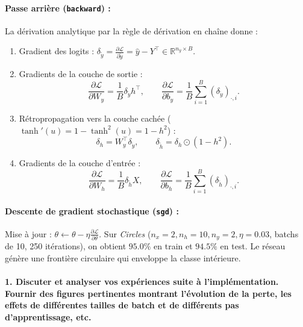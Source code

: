 \documentclass{report}
\begin{document}
\paragraph{Passe arrière (\texttt{backward}) :}
La dérivation analytique par la règle de dérivation en chaîne donne :
\begin{enumerate}
    \item Gradient des logits : $\delta_{\tilde{y}} = \frac{\partial \mathcal{L}}{\partial \tilde{y}} = \hat{y} - Y^\top \in \mathbb{R}^{n_y \times B}$.
    \item Gradients de la couche de sortie :
    \begin{equation}
        \frac{\partial \mathcal{L}}{\partial W_y} = \frac{1}{B} \delta_{\tilde{y}} h^\top, \qquad
        \frac{\partial \mathcal{L}}{\partial b_y} = \frac{1}{B} \sum_{i=1}^B (\delta_{\tilde{y}})_{\cdot, i}.
    \end{equation}
    \item Rétropropagation vers la couche cachée ($\tanh'(u) = 1 - \tanh^2(u) = 1 - h^2$) :
    \begin{equation}
        \delta_h = W_y^\top \delta_{\tilde{y}}, \qquad
        \delta_{\tilde{h}} = \delta_h \odot (1 - h^2).
    \end{equation}
    \item Gradients de la couche d'entrée :
    \begin{equation}
        \frac{\partial \mathcal{L}}{\partial W_h} = \frac{1}{B} \delta_{\tilde{h}} X, \qquad
        \frac{\partial \mathcal{L}}{\partial b_h} = \frac{1}{B} \sum_{i=1}^B (\delta_{\tilde{h}})_{\cdot, i}.
    \end{equation}
\end{enumerate}

\paragraph{Descente de gradient stochastique (\texttt{sgd}) :}
Mise à jour : $\theta \leftarrow \theta - \eta \frac{\partial \mathcal{L}}{\partial \theta}$. Sur \textit{Circles} ($n_x = 2, n_h = 10, n_y = 2, \eta = 0.03$, batchs de 10, 250 itérations), on obtient $95.0\%$ en train et $94.5\%$ en test. Le réseau génère une frontière circulaire qui enveloppe la classe intérieure.

\paragraph{1. Discuter et analyser vos expériences suite à l'implémentation. Fournir des figures pertinentes montrant l'évolution de la perte, les effets de différentes tailles de batch et de différents pas d'apprentissage, etc.}
\end{document}
